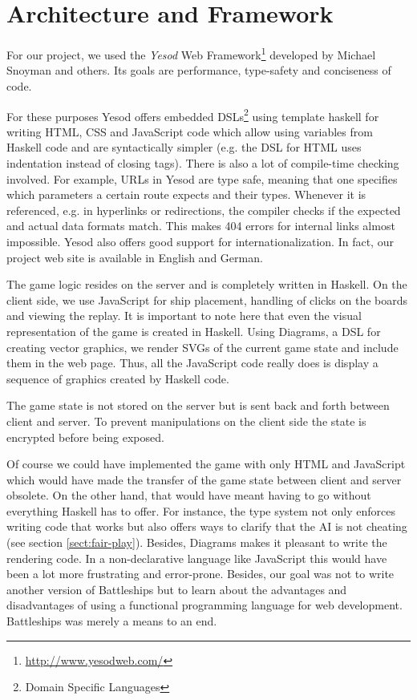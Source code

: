 \documentclass[a4paper]{easychair}
\begin{document}
\section{Architecture and Framework}

For our project, we used the \emph{Yesod} Web Framework\footnote{\url{http://www.yesodweb.com/}} developed by Michael Snoyman and others. Its goals are performance, type-safety and conciseness of code.

For these purposes Yesod offers embedded DSLs\footnote{Domain Specific Languages} using template haskell for writing HTML, CSS and JavaScript code which allow using variables from Haskell code and are syntactically simpler (e.g. the DSL for HTML uses indentation instead of closing tags). There is also a lot of compile-time checking involved. For example, URLs in Yesod are type safe, meaning that one specifies which parameters a certain route expects and their types. Whenever it is referenced, e.g. in hyperlinks or redirections, the compiler checks if the expected and actual data formats match. This makes 404 errors for internal links almost impossible. Yesod also offers good support for internationalization. In fact, our project web site is available in English and German.

The game logic resides on the server and is completely written in Haskell. On the client side, we use JavaScript for ship placement, handling of clicks on the boards and viewing the replay. It is important to note here that even the visual representation of the game is created in Haskell. Using Diagrams, a DSL for creating vector graphics, we render SVGs of the current game state and include them in the web page. Thus, all the JavaScript code really does is display a sequence of graphics created by Haskell code. 

The game state is not stored on the server but is sent back and forth between client and server. To prevent manipulations on the client side the state is encrypted before being exposed.

Of course we could have implemented the game with only HTML and JavaScript which would have made the transfer of the game state between client and server obsolete. On the other hand, that would have meant having to go without everything Haskell has to offer. For instance, the type system not only enforces writing code that works but also offers ways to clarify that the AI is not cheating (see section \ref{sect:fair-play}). Besides, Diagrams makes it pleasant to write the rendering code. In a non-declarative language like JavaScript this would have been a lot more frustrating and error-prone. Besides, our goal was not to write another version of Battleships but to learn about the advantages and disadvantages of using a functional programming language for web development. Battleships was merely a means to an end.
\end{document}
